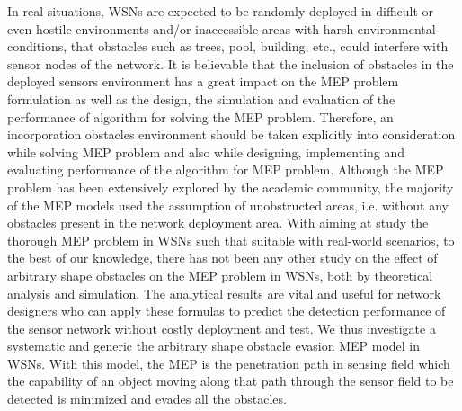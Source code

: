 \documentclass[final]{elsarticle}
\begin{document}
In real situations, WSNs are expected to be randomly deployed in difficult or even hostile environments and/or inaccessible areas with harsh environmental conditions, that obstacles such as trees, pool, building, etc., could interfere with sensor nodes of the network. It is believable that the inclusion of obstacles in the deployed sensors environment has a great impact on the MEP problem formulation as well as the design, the simulation and evaluation of the performance of algorithm for solving the MEP problem. Therefore, an incorporation obstacles environment should be taken explicitly into consideration while solving MEP problem and also while designing, implementing and evaluating performance of the algorithm for MEP problem. Although the MEP problem has been extensively explored by the academic community, the majority of the MEP models used the assumption of unobstructed areas, i.e. without any obstacles present in the network deployment area. With aiming at study the thorough MEP problem in WSNs such that suitable with real-world scenarios, to the best of our knowledge, there has not been any other study on the effect of arbitrary shape obstacles on the MEP problem in WSNs, both by theoretical analysis and simulation. The analytical results are vital and useful for network designers who can apply these formulas to predict the detection performance of the sensor network without costly deployment and test. We thus investigate a systematic and generic the arbitrary shape obstacle evasion MEP model in WSNs. With this model, the MEP is the penetration path in sensing field which the capability of an object moving along that path through the sensor field to be detected is minimized and evades all the obstacles. 
\end{document}
